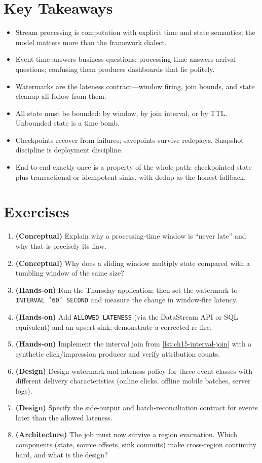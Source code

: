 \section*{Key Takeaways}
\begin{itemize}
    \item Stream processing is computation with explicit time and state semantics; the model matters more than the framework dialect.
    \item Event time answers business questions; processing time answers arrival questions; confusing them produces dashboards that lie politely.
    \item Watermarks are the lateness contract---window firing, join bounds, and state cleanup all follow from them.
    \item All state must be bounded: by window, by join interval, or by TTL. Unbounded state is a time bomb.
    \item Checkpoints recover from failures; savepoints survive redeploys. Snapshot discipline is deployment discipline.
    \item End-to-end exactly-once is a property of the whole path: checkpointed state plus transactional or idempotent sinks, with dedup as the honest fallback.
\end{itemize}

\section{Exercises}
\begin{enumerate}
    \item \textbf{(Conceptual)} Explain why a processing-time window is ``never late'' and why that is precisely its flaw.
    \item \textbf{(Conceptual)} Why does a sliding window multiply state compared with a tumbling window of the same size?
    \item \textbf{(Hands-on)} Run the Thursday application; then set the watermark to \texttt{- INTERVAL '60' SECOND} and measure the change in window-fire latency.
    \item \textbf{(Hands-on)} Add \texttt{ALLOWED\_LATENESS} (via the DataStream API or SQL equivalent) and an upsert sink; demonstrate a corrected re-fire.
    \item \textbf{(Hands-on)} Implement the interval join from \cref{lst:ch15-interval-join} with a synthetic click/impression producer and verify attribution counts.
    \item \textbf{(Design)} Design watermark and lateness policy for three event classes with different delivery characteristics (online clicks, offline mobile batches, server logs).
    \item \textbf{(Design)} Specify the side-output and batch-reconciliation contract for events later than the allowed lateness.
    \item \textbf{(Architecture)} The job must now survive a region evacuation. Which components (state, source offsets, sink commits) make cross-region continuity hard, and what is the design?
\end{enumerate}

